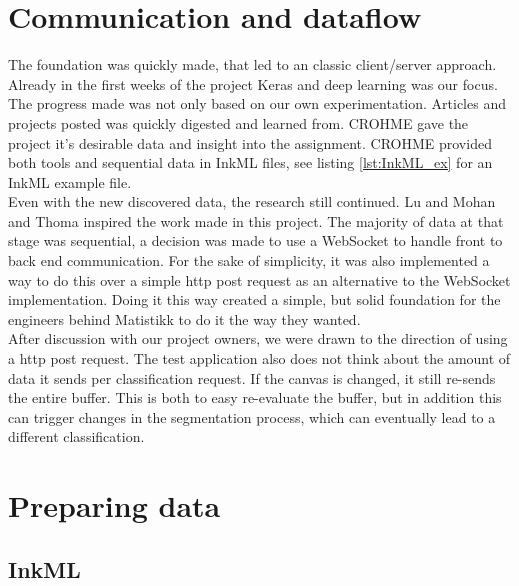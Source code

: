 \section{Communication and dataflow}
The foundation was quickly made, that led to an classic client/server approach. Already in the first weeks of the project Keras and deep learning was our focus.%
The progress made was not only based on our own experimentation. Articles and projects posted was quickly digested and learned from. CROHME gave the project it's desirable data and insight into the assignment. CROHME provided both tools and  sequential data in InkML files, see listing \ref{lst:InkML_ex} for an InkML example file.\\
Even with the new discovered data, the research still continued.  Lu and Mohan \cite{lu_recognition_2015} and Thoma \cite{thoma_-line_2015} inspired the work made in this project. The majority of data at that stage was sequential, a decision was made to use a \gls{WebSocket} to handle front to back end communication. For the sake of simplicity, it was also implemented a way to do this over a simple http post request as an alternative to the WebSocket implementation. Doing it this way created a simple, but solid foundation for the engineers behind Matistikk to do it the way they wanted. \\
After discussion with our project owners, we were drawn to the direction of using a http post request. The test application also does not think about the amount of data it sends per classification request. If the canvas is changed, it still re-sends the entire buffer. This is both to easy re-evaluate the buffer, but in addition this can trigger changes in the segmentation process, which can eventually lead to a different classification.


\section{Preparing data}

\subsection{InkML}

